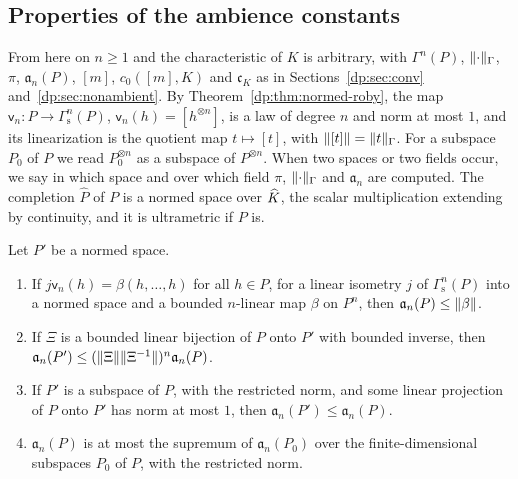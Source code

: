 \subsection{Properties of the ambience constants}\label{dp:ac:constants}

From here on $n\ge1$ and the characteristic of $K$ is arbitrary, with $\Gamma^n(P)$, $\lVert \cdot\rVert_\Gamma$, $\pi$, $\mathfrak a_n(P)$, $[m]$, $c_0([m],K)$ and $\mathfrak c_K$ as in Sections~\ref{dp:sec:conv} and~\ref{dp:sec:nonambient}. By Theorem~\ref{dp:thm:normed-roby}, the map $\mathsf v_n\colon P\to\Gamma^n_{\mathrm s}(P)$, $\mathsf v_n(h)=[h^{\otimes n}]$, is a law of degree $n$ and norm at most $1$, and its linearization is the quotient map $t\mapsto[t]$, with $\lVert [t]\rVert=\lVert t\rVert_\Gamma$. For a subspace $P_0$ of $P$ we read $P_0^{\otimes n}$ as a subspace of $P^{\otimes n}$. When two spaces or two fields occur, we say in which space and over which field $\pi$, $\lVert \cdot\rVert_\Gamma$ and $\mathfrak a_n$ are computed. The completion $\widehat P$ of $P$ is a normed space over $\widehat K$, the scalar multiplication extending by continuity, and it is ultrametric if $P$ is.

\begin{lemma}\label{dp:lem:constants}
Let $P'$ be a normed space.
\begin{enumerate}
\item If $j\mathsf v_n(h)=\beta(h,\dots,h)$ for all $h\in P$, for a linear isometry $j$ of $\Gamma^n_{\mathrm s}(P)$ into a normed space and a bounded $n$\nobreakdash-linear map $\beta$ on $P^n$, then $\mathfrak a_n(P)\le\lVert \beta\rVert$.
\item If $\Xi$ is a bounded linear bijection of $P$ onto $P'$ with bounded inverse, then $\mathfrak a_n(P')\le(\lVert \Xi\rVert\lVert \Xi^{-1}\rVert)^n\mathfrak a_n(P)$.
\item If $P'$ is a subspace of $P$, with the restricted norm, and some linear projection of $P$ onto $P'$ has norm at most $1$, then $\mathfrak a_n(P')\le\mathfrak a_n(P)$.
\item $\mathfrak a_n(P)$ is at most the supremum of $\mathfrak a_n(P_0)$ over the finite-dimensional subspaces $P_0$ of $P$, with the restricted norm.
\end{enumerate}
\end{lemma}


